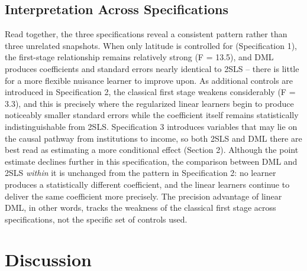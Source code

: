 \documentclass[10pt,twocolumn]{article}
\begin{document}
\subsection{Interpretation Across Specifications}
Read together, the three specifications reveal a consistent pattern
rather than three unrelated snapshots. When only latitude is controlled
for (Specification 1), the first-stage relationship remains relatively
strong (F = 13.5), and DML produces coefficients and standard errors
nearly identical to 2SLS -- there is little for a more flexible
nuisance learner to improve upon. As additional controls are introduced
in Specification 2, the classical first stage weakens considerably
(F = 3.3), and this is precisely where the regularized linear learners
begin to produce noticeably smaller standard errors while the
coefficient itself remains statistically indistinguishable from 2SLS.
Specification 3 introduces variables that may lie on the causal pathway
from institutions to income, so both 2SLS and DML there are best read
as estimating a more conditional effect (Section 2). Although the point
estimate declines further in this specification, the comparison between
DML and 2SLS \emph{within} it is unchanged from the pattern in
Specification 2: no learner produces a statistically different
coefficient, and the linear learners continue to deliver the same
coefficient more precisely. The precision advantage of linear DML,
in other words, tracks the weakness of the classical first stage
across specifications, not the specific set of controls used.

\section{Discussion}
\end{document}

